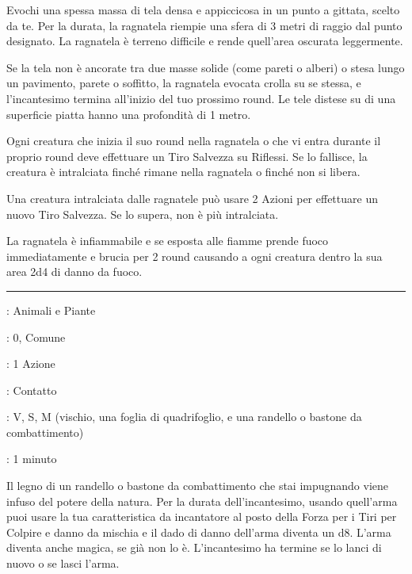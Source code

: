 \begin{multicols}{2}
Evochi una spessa massa di tela densa e appiccicosa in un punto a gittata, scelto da te. Per la durata, la ragnatela riempie una sfera di 3 metri di raggio dal punto designato. La ragnatela è terreno difficile e rende quell'area oscurata leggermente.

Se la tela non è ancorate tra due masse solide (come pareti o alberi) o stesa lungo un pavimento, parete o soffitto, la ragnatela evocata crolla su se stessa, e l'incantesimo termina all'inizio del tuo prossimo round. Le tele distese su di una superficie piatta hanno una profondità di 1 metro.

Ogni creatura che inizia il suo round nella ragnatela o che vi entra durante il proprio round deve effettuare un Tiro Salvezza su Riflessi. Se lo fallisce, la creatura è intralciata finché rimane nella ragnatela o finché non si libera.

Una creatura intralciata dalle ragnatele può usare 2 Azioni per effettuare un nuovo Tiro Salvezza. Se lo supera, non è più intralciata.

La ragnatela è infiammabile e se esposta alle fiamme prende fuoco immediatamente e brucia per 2 round causando a ogni creatura dentro la sua area 2d4 di danno da fuoco.

\smallskip\noindent\rule{\linewidth}{2pt} \hypertarget{Randello Incantato}{}\smallskip{}
\noindent
\begin{description}[noitemsep, topsep=0pt, parsep=0pt, partopsep=0pt, leftmargin=0cm, labelwidth=2.8cm]
	\item[\textbf{Lista di Magia}]: Animali e Piante
	\item[\textbf{Livello}]: 0, Comune
	\item[\textbf{T. di Lancio}]: 1 Azione
	\item[\textbf{Gittata}]: Contatto
	\item[\textbf{Componenti}]: V, S, M (vischio, una foglia di quadrifoglio, e una randello o bastone da combattimento)
	\item[\textbf{Durata}]: 1 minuto
\end{description}

Il legno di un randello o bastone da combattimento che stai impugnando viene infuso del potere della natura. Per la durata dell'incantesimo, usando quell'arma puoi usare la tua caratteristica da incantatore al posto della Forza per i Tiri per Colpire e danno da mischia e il dado di danno dell'arma diventa un d8. L'arma diventa anche magica, se già non lo è. L'incantesimo ha termine se lo lanci di nuovo o se lasci l'arma.


\end{multicols}
